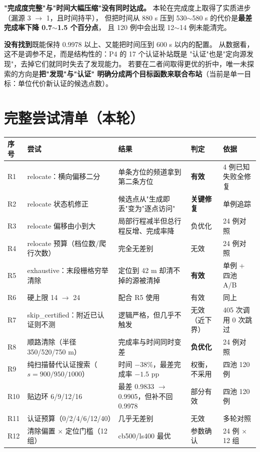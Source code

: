 \begin{warnbox}[title=诚实结论]
\textbf{"完成度完整"与"时间大幅压缩"没有同时达成。}
本轮在完成度上取得了实质进步（漏源 3 $\to$ 1，且时间持平），
但把时间从 880 s 压到 530$\sim$580 s 的代价是\textbf{最差完成率下降 0.7$\sim$1.5 个百分点}，
且 120 例中会出现 12$\sim$14 例未能清完。

\textbf{没有找到}既能保持 0.9978 以上、又能把时间压到 600 s 以内的配置。
从数据看，这不是调参不足，而是结构性的：P4 的 17 个认证补站既是
"认证"也是"定向源发现"，去掉它们就同时失去了发现能力。
若要在二者间取得更优的折中，唯一未探索的方向是\textbf{把"发现"与"认证"
明确分成两个目标函数来联合布站}（当前是单一目标：单位代价新认证的候选点数）。
\end{warnbox}

\section{完整尝试清单（本轮）}

\begin{center}
\footnotesize
\scriptsize
\begin{longtable}{p{0.5cm}p{3.4cm}p{3.2cm}p{2.3cm}p{3.1cm}}
\toprule
序号 & 尝试 & 结果 & 判定 & 依据 \\ \midrule
\endhead
R1 & relocate：横向偏移二分 & 单条方位的频道拿到第二条方位 & \textbf{有效} & 4 例已知失败全修复 \\
R2 & relocate 状态机修正 & 候选点从"生成即丢"变为"逐点访问" & \textbf{关键修复} & 单例追踪 \\
R3 & relocate 偏移由小到大 & 局部行程减半但总行程反增、完成率降 & 负优化 & 24 例对照 \\
R4 & relocate 预算（档位数/爬行次数） & 完全无差别 & 无效 & 24 例对照 \\
R5 & exhaustive：末段栅格穷举清除 & 定位到 42 m 却清不掉的源被清掉 & \textbf{有效} & 单例 + 四池 A/B \\
R6 & 硬上限 14 $\to$ 24 & 配合 R5 使用 & 有效 & 同上 \\
R7 & skip\_certified：附近已认证则不测 & 逻辑严格，但几乎不触发 & 无效（近下界） & 405 次调用 0 次跳过 \\
R8 & 顺路清除（半径 350/520/750 m） & 完成率与时间同时变差 & \textbf{负优化} & 24 例对照 \\
R9 & 纯扫描替代认证搜索（$s{=}900/950/1000$） & 时间 $-38\%$，最差完成率 $-1.5$ pp & 权衡，不采用 & 四池 120 例 \\
R10 & 贴边环 6/9/12/16 & 最差 0.9833 $\to$ 0.9905，但补不回 0.9978 & 部分有效 & 四池 120 例 \\
R11 & 认证预算（0/2/4/6/12/40） & 几乎无差别 & 无效 & 多轮对照 \\
R12 & 清除偏置 $\times$ 定位门槛（12 组） & cb500/ls400 最优 & 参数确认 & 24 例 × 12 组 \\
\bottomrule
\end{longtable}
\end{center}


